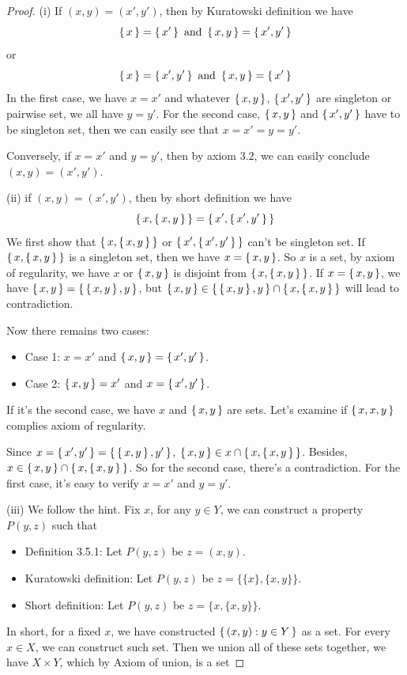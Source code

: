 \documentclass{article}
\begin{document}
\begin{proof}
    (i) If $(x, y) = (x', y')$, then by Kuratowski definition we have
    \[\set{x}=\set{x'}\text{ and }\set{x,y}=\set{x',y'}\]
    or
    \[\set{x}=\set{x',y'}\text{ and }\set{x,y}=\set{x'}\]
    In the first case, we have $x=x'$ and whatever $\set{x,y}$, $\set{x',y'}$
    are singleton or pairwise set, we all have $y=y'$.
    For the second case, $\set{x,y}$ and $\set{x',y'}$ have to be singleton set,
    then we can easily see that $x=x'=y=y'$.

    Conversely, if $x=x'$ and $y=y'$, then by axiom 3.2, we can easily conclude $(x, y) = (x', y')$.

    (ii) if $(x, y) = (x', y')$, then by short definition we have
    \[\set{x,\set{x,y}}=\set{x',\set{x',y'}}\]
    We first show that $\set{x,\set{x,y}}$ or $\set{x',\set{x',y'}}$ can't be singleton set.
    If $\set{x,\set{x,y}}$ is a singleton set, then we have $x=\set{x,y}$.
    So $x$ is a set, by axiom of regularity, we have $x$ or $\set{x,y}$ is disjoint from $\set{x,\set{x,y}}$.
    If $x=\set{x,y}$, we have $\set{x,y}=\set{\set{x,y},y}$,
    but $\set{x,y}\in\set{\set{x,y},y}\cap\set{x,\set{x,y}}$ will lead to contradiction.

    Now there remains two cases:
    \begin{itemize}
        \item Case 1: $x=x'$ and $\set{x,y}=\set{x',y'}$.
        \item Case 2: $\set{x,y}=x'$ and $x=\set{x',y'}$.
    \end{itemize}
    If it's the second case, we have $x$ and $\set{x,y}$ are sets.
    Let's examine if $\set{x,{x,y}}$ complies axiom of regularity.

    Since $x=\set{x',y'}=\set{\set{x,y},y'}$, $\set{x,y}\in x\cap\set{x,\set{x,y}}$.
    Besides, $x\in\set{x,y}\cap\set{x,\set{x,y}}$.
    So for the second case, there's a contradiction.
    For the first case, it's easy to verify $x=x'$ and $y=y'$.

    (iii) We follow the hint. Fix $x$, for any $y\in Y$, we can construct a property $P(y,z)$ such that
    \begin{itemize}
        \item Definition 3.5.1: Let $P(y,z)$ be $z=(x,y)$.
        \item Kuratowski definition: Let $P(y,z)$ be $z=\{\{x\},\{x,y\}\}$.
        \item Short definition: Let $P(y,z)$ be $z=\{x,\{x,y\}\}$.
    \end{itemize}
    In short, for a fixed $x$, we have constructed $\set{(x,y):y\in Y}$ as a set.
    For every $x\in X$, we can construct such set.
    Then we union all of these sets together, we have $X\times Y$, which by Axiom of union, is a set
\end{proof}
\end{document}
